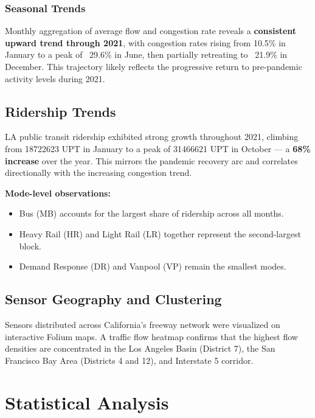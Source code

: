 \documentclass[12pt,a4paper]{article}
\begin{document}
\subsubsection{Seasonal Trends}

Monthly aggregation of average flow and congestion rate reveals a \textbf{consistent upward trend through 2021}, with congestion rates rising from 10.5\% in January to a peak of ~29.6\% in June, then partially retreating to ~21.9\% in December. This trajectory likely reflects the progressive return to pre-pandemic activity levels during 2021.

\subsection{Ridership Trends}

LA public transit ridership exhibited strong growth throughout 2021, climbing from \num{18722623} UPT in January to a peak of \num{31466621} UPT in October — a \textbf{68\% increase} over the year. This mirrors the pandemic recovery arc and correlates directionally with the increasing congestion trend.

\textbf{Mode-level observations:}
\begin{itemize}
    \item Bus (MB) accounts for the largest share of ridership across all months.
    \item Heavy Rail (HR) and Light Rail (LR) together represent the second-largest block.
    \item Demand Response (DR) and Vanpool (VP) remain the smallest modes.
\end{itemize}

\subsection{Sensor Geography and Clustering}

Sensors distributed across California's freeway network were visualized on interactive Folium maps. A traffic flow heatmap confirms that the highest flow densities are concentrated in the Los Angeles Basin (District 7), the San Francisco Bay Area (Districts 4 and 12), and Interstate 5 corridor.

\section{Statistical Analysis}
\label{sec:stats}
\end{document}
